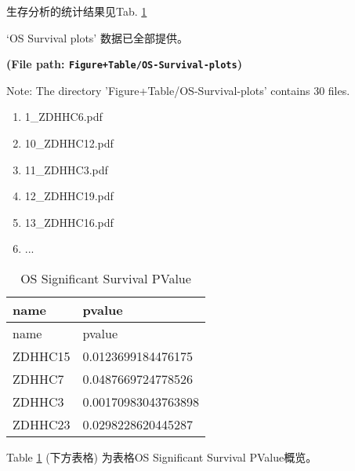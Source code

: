\documentclass[
]{article}
\providecommand{\tightlist}{%
  \setlength{\itemsep}{0pt}\setlength{\parskip}{0pt}}
\begin{document}
生存分析的统计结果见Tab. \ref{tab:OS-Significant-Survival-PValue}

\begin{center}\vspace{1.5cm}\end{center}

`OS Survival plots' 数据已全部提供。

\textbf{(File path: \texttt{Figure+Table/OS-Survival-plots})}

\begin{center}\begin{tcolorbox}[colback=gray!10, colframe=gray!50, width=0.9\linewidth, arc=1mm, boxrule=0.5pt]Note: The directory 'Figure+Table/OS-Survival-plots' contains 30 files.

\begin{enumerate}\tightlist
\item 1\_ZDHHC6.pdf
\item 10\_ZDHHC12.pdf
\item 11\_ZDHHC3.pdf
\item 12\_ZDHHC19.pdf
\item 13\_ZDHHC16.pdf
\item ...
\end{enumerate}\end{tcolorbox}
\end{center}

\begin{center}\vspace{1.5cm}\end{center}

\begin{center}\vspace{1.5cm}\end{center}

\begin{longtable}[]{@{}ll@{}}
\caption{\label{tab:OS-Significant-Survival-PValue}OS Significant Survival PValue}\tabularnewline
\toprule
name & pvalue\tabularnewline
\midrule
\endfirsthead
\toprule
name & pvalue\tabularnewline
\midrule
\endhead
ZDHHC15 & 0.0123699184476175\tabularnewline
ZDHHC7 & 0.0487669724778526\tabularnewline
ZDHHC3 & 0.00170983043763898\tabularnewline
ZDHHC23 & 0.0298228620445287\tabularnewline
\bottomrule
\end{longtable}

Table \ref{tab:OS-Significant-Survival-PValue} (下方表格) 为表格OS Significant Survival PValue概览。
\end{document}
